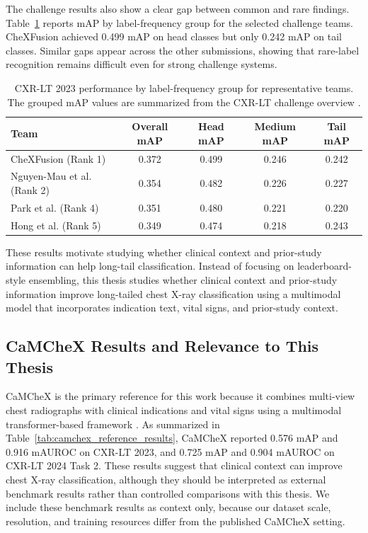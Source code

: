 The challenge results also show a clear gap between common and rare findings. Table~\ref{tab:cxrlt2023_longtail} reports mAP by label-frequency group for the selected challenge teams. CheXFusion achieved 0.499 mAP on head classes but only 0.242 mAP on tail classes. Similar gaps appear across the other submissions, showing that rare-label recognition remains difficult even for strong challenge systems.

\begin{table}[H]
    \centering
    \caption[CXR-LT 2023 performance by label-frequency group]{CXR-LT 2023 performance by label-frequency group for representative teams. The grouped mAP values are summarized from the CXR-LT challenge overview \cite{holste2024cxrlt}.}
    \label{tab:cxrlt2023_longtail}
    \begin{tabular}{lcccc}
        \hline
        Team & Overall mAP & Head mAP & Medium mAP & Tail mAP \\
        \hline
        CheXFusion \cite{kim2023chexfusion} (Rank 1) & 0.372 & 0.499 & 0.246 & 0.242 \\
        Nguyen-Mau et al. \cite{nguyenmau2023advanced} (Rank 2) & 0.354 & 0.482 & 0.226 & 0.227 \\
        Park et al. \cite{park2023robust} (Rank 4) & 0.351 & 0.480 & 0.221 & 0.220 \\
        Hong et al. \cite{hong2023bagoftricks} (Rank 5) & 0.349 & 0.474 & 0.218 & 0.243 \\
        \hline
    \end{tabular}
\end{table}

These results motivate studying whether clinical context and prior-study information can help long-tail classification. Instead of focusing on leaderboard-style ensembling, this thesis studies whether clinical context and prior-study information improve long-tailed chest X-ray classification using a multimodal model that incorporates indication text, vital signs, and prior-study context.

\subsection{CaMCheX Results and Relevance to This Thesis}
\label{subsec:related_camchex_results}

CaMCheX is the primary reference for this work because it combines multi-view chest radiographs with clinical indications and vital signs using a multimodal transformer-based framework \cite{sloan2025camchex}. As summarized in Table~\ref{tab:camchex_reference_results}, CaMCheX reported 0.576 mAP and 0.916 mAUROC on CXR-LT 2023, and 0.725 mAP and 0.904 mAUROC on CXR-LT 2024 Task 2. These results suggest that clinical context can improve chest X-ray classification, although they should be interpreted as external benchmark results rather than controlled comparisons with this thesis. We include these benchmark results as context only, because our dataset scale, resolution, and training resources differ from the published CaMCheX setting.

